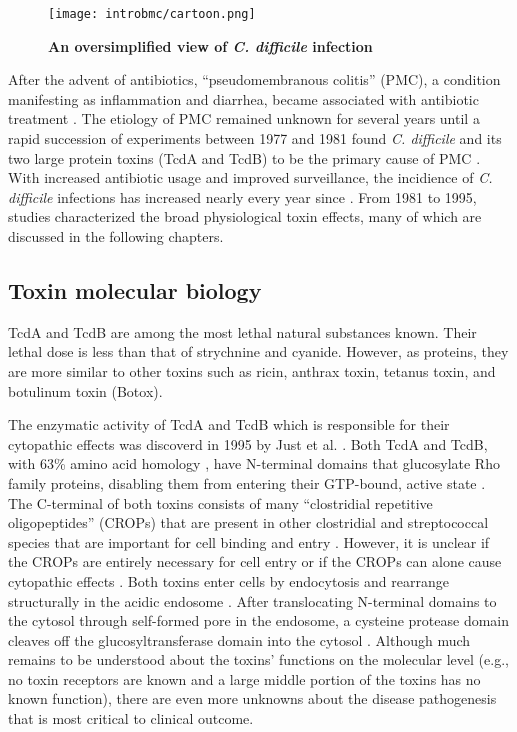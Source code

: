 \begin{figure}[h!]
  \centering
  \texttt{[image: introbmc/cartoon.png]}
  \caption{\textbf{An oversimplified view of \textit{C. difficile} infection}}
  \label{introbmc:cartoon}
\end{figure}

After the advent of antibiotics, ``pseudomembranous colitis'' (PMC), a condition
manifesting as inflammation and diarrhea, became associated
with antibiotic treatment \cite{Tedesco:1974jo,Bartlett:2008jx}. 
The etiology of PMC remained unknown
for several years until a rapid succession of experiments between 1977 and 1981
found \textit{C. difficile} and its two large protein toxins (TcdA and TcdB)
 to be the primary cause of PMC 
\cite{Lusk:1978ub,Chang:1978um,Browne:1977ui,Fekety:1979ul,
Ebright:1981uj,Taylor:1981uda,Bartlett:1978tj,Bartlett:1977wra,
Lusk:1977wg,MRKeighley:1978ku}. 
With increased antibiotic usage and improved surveillance,
the incidience of \textit{C. difficile} infections has increased 
nearly every year since \cite{Lucado:2012wl}.
From 1981 to 1995, 
studies characterized the broad physiological toxin effects,
many of which are discussed in the following chapters.


\subsection{Toxin molecular biology}
TcdA and TcdB are among the most lethal natural substances known.
Their lethal dose is less than that of strychnine and cyanide.
However, as proteins, they are more similar to other toxins such as 
ricin, anthrax toxin,
tetanus toxin, and botulinum toxin (Botox).

The enzymatic activity of TcdA and TcdB which is responsible
for their cytopathic effects was discoverd 
in 1995 by Just et al. \cite{Just:1995ei,Just:1995kz}.
Both TcdA and TcdB, with 63\% amino acid
homology \cite{vonEichelStreiber:1992wu}, have N-terminal
domains that glucosylate Rho family proteins, disabling
them from entering their GTP-bound, active state \cite{Just:1995ei,Just:1995kz}.
The C-terminal of both toxins consists of many ``clostridial
repetitive oligopeptides'' (CROPs) that are present in 
other clostridial and streptococcal species 
\cite{vonEichelStreiber:1990ti,vonEichelStreiber:1992vb}
that are important for cell binding and 
entry \cite{Ho:2005vm,Greco:2006wf,Frisch:2003jo}.
However, it is unclear if the CROPs are entirely necessary
for cell entry or if the CROPs can alone cause
cytopathic effects \cite{Yeh:2008hda,Zemljic:2010ub}. Both toxins
enter cells by endocytosis and rearrange structurally
in the acidic endosome \cite{Papatheodorou:2010io,QaDan:2000fj}.
After translocating N-terminal domains to the cytosol through
self-formed pore in the endosome,
a cysteine protease domain cleaves off the glucosyltransferase
domain into the cytosol \cite{Egerer:2007fy,Genisyuerek:2011dr,Pfeifer:2003bx}.
Although much remains to be understood about the 
toxins' functions on the molecular level (e.g., no toxin receptors are known and
a large middle portion of the toxins has no known function), there
are even more unknowns about the disease pathogenesis that
is most critical to clinical outcome.


